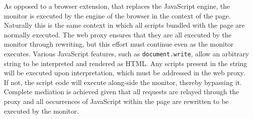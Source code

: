 \documentclass{llncs}
\newcommand{\todo}[1]{\colorbox{red}{\textcolor{white}{\sffamily\bfseries\scriptsize TODO}} \textcolor{red}{#1} \textcolor{red}{$\blacktriangleleft$}}
\begin{document}
As opposed to a browser extension, that replaces the 
JavaScript engine, the monitor is executed by the engine of the browser in the context of the page. Naturally 
this is the same context in which all scripts bundled with the 
page are normally executed. 
The web proxy ensures that they are all executed by
the monitor through rewriting, but this effort must continue even as the monitor executes. 
Various JavaScript features, such as 
\lstinline{document.write}, allow an arbitrary string to be 
interpreted and rendered as HTML. 
Any scripts present in the string will be 
executed upon interpretation, which must be addressed in the web proxy. If not, the script code will execute 
along-side the monitor, thereby bypassing it. 
Complete mediation is achieved given that all requests are relayed through the proxy 
and all occurrences of JavaScript within the page are rewritten to be executed by the monitor.
\end{document}
